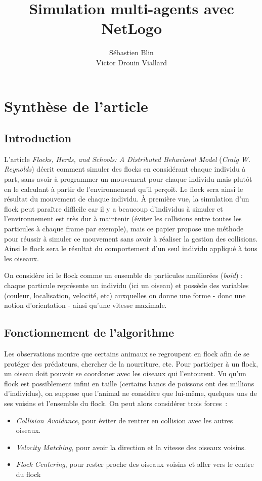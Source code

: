\documentclass{article}
\title{Simulation multi-agents avec NetLogo}
\author{Sébastien Blin\\Victor Drouin Viallard}
\begin{document}
\maketitle

\section{Synthèse de l'article}
\subsection{Introduction}
L'article \emph{Flocks, Herds, and Schools: A Distributed Behavioral Model} (\emph{Craig W. Reynolds}) décrit comment simuler des flocks en considérant chaque individu à part, sans avoir à programmer un mouvement pour chaque individu mais plutôt en le calculant à partir de l'environnement qu'il perçoit. Le flock sera ainsi le résultat du mouvement de chaque individu. À première vue, la simulation d'un flock peut paraître difficile car il y a beaucoup d'individus à simuler et l'environnement est très dur à maintenir (éviter les collisions entre toutes les particules à chaque frame par exemple), mais ce papier propose une méthode pour réussir à simuler ce mouvement sans avoir à réaliser la gestion des collisions. Ainsi le flock sera le résultat du comportement d'un seul individu appliqué à tous les oiseaux.

On considère ici le flock comme un ensemble de particules améliorées (\emph{boid}) : chaque particule représente un individu (ici un oiseau) et possède des variables (couleur, localisation, velocité, etc) auxquelles on donne une forme - donc une notion d'orientation - ainsi qu'une vitesse maximale.

\subsection{Fonctionnement de l'algorithme}
Les observations montre que certains animaux se regroupent en flock afin de se protéger des prédateurs, chercher de la nourriture, etc. Pour participer à un flock, un oiseau doit pouvoir se coordoner avec les oiseaux qui l'entourent. Vu qu'un flock est possiblement infini en taille (certains bancs de poissons ont des millions d'individus), on suppose que l'animal ne considère que lui-même, quelques uns de ses voisins et l'ensemble du flock. On peut alors considérer trois forces~:

\begin{itemize}
  \item \emph{Collision Avoidance}, pour éviter de rentrer en collision avec les autres oiseaux.
  \item \emph{Velocity Matching}, pour avoir la direction et la vitesse des oiseaux voisins.
  \item \emph{Flock Centering}, pour rester proche des oiseaux voisins et aller vers le centre du flock
\end{itemize}
\end{document}
